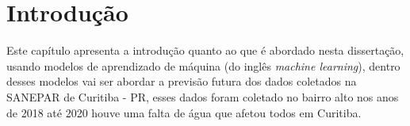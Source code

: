 

\section{Introdução} \label{sec:int}

Este capítulo apresenta a introdução quanto ao que é abordado nesta dissertação, usando modelos de aprendizado de máquina (do inglês \textit{machine learning}), dentro desses modelos vai ser abordar a previsão futura dos dados coletados na SANEPAR de Curitiba - PR, esses dados foram coletado no bairro alto nos anos de 2018 até 2020 houve uma falta de água que afetou todos em Curitiba.




    
          
    
    
    
    
    
    
    
    